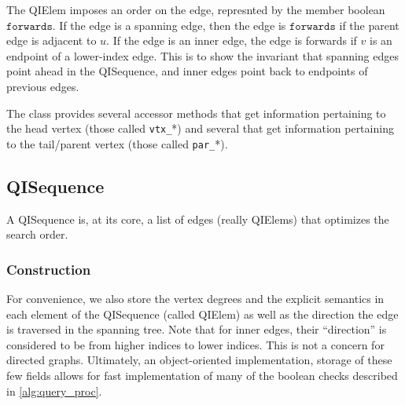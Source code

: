 The QIElem imposes an order on the edge, represnted by the member boolean
$\texttt{forwards}$. If the edge is a spanning edge, then the edge is
$\texttt{forwards}$ if the parent edge is adjacent to $u$. If the edge is an
inner edge, the edge is forwards if $v$ is an endpoint of a lower-index edge.
This is to show the invariant that spanning edges point ahead in the
QISequence, and inner edges point back to endpoints of previous edges.

The class provides several accessor methods that get information pertaining to
the head vertex (those called \texttt{vtx\_}*)  and several that get information
pertaining to the tail/parent vertex (those called \texttt{par\_}*).

\subsection{QISequence}

A QISequence is, at its core, a list of edges (really QIElems) that optimizes
the search order.

\subsubsection{Construction}
For convenience, we also store the vertex degrees and the explicit semantics in
each element of the QISequence (called QIElem) as well as the direction the edge
is traversed in the spanning tree. Note that for inner edges, their
``direction'' is considered to be from higher indices to lower indices.  This is
not a concern for directed graphs. Ultimately, an object-oriented
implementation, storage of these few fields allows for fast implementation of
many of the boolean checks described in \ref{alg:query_proc}.

